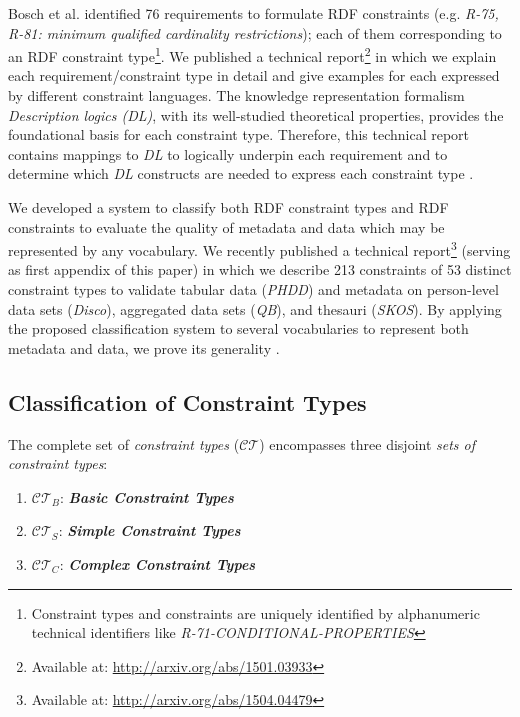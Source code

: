 \documentclass{llncs}
\begin{document}
Bosch et al. identified 76 requirements to formulate RDF constraints (e.g. \emph{R-75, R-81: minimum qualified cardinality restrictions}); each of them corresponding to an RDF constraint type\footnote{Constraint types and constraints are uniquely identified by alphanumeric technical identifiers like \emph{R-71-CONDITIONAL-PROPERTIES}}\cite{BoschNolleAcarEckert2015}. 
We published a technical report\footnote{Available at: \url{http://arxiv.org/abs/1501.03933}} in which we explain each requirement/constraint type in detail and give examples for each expressed by different constraint languages.
The knowledge representation formalism \emph{Description logics (DL)}, with its  well-studied theoretical properties, provides the foundational basis for each constraint type.
Therefore, this technical report contains mappings to \emph{DL} to logically underpin each requirement and to determine which \emph{DL} constructs are needed to express each constraint type \cite{BoschNolleAcarEckert2015}.

We developed a system to classify both RDF constraint types and RDF constraints to evaluate the quality of metadata and data which may be represented by any vocabulary.
We recently published a technical report\footnote{\label{technical-report-1}Available at: \url{http://arxiv.org/abs/1504.04479}} (serving as first appendix of this paper) in which we describe 213 constraints of 53 distinct constraint types 
to validate tabular data (\emph{PHDD}) and metadata on person-level data sets (\emph{Disco}), aggregated data sets (\emph{QB}), and thesauri (\emph{SKOS}).
By applying the proposed classification system to several vocabularies to represent both metadata and data, we prove its generality \cite{BoschZapilkoWackerowEckert2015}.

\subsection{Classification of Constraint Types}

The complete set of \emph{constraint types} ($\mathcal{CT}$) encompasses three disjoint \emph{sets of constraint types}:
\begin{enumerate}
	\item $\mathcal{CT}_{B}$: \textbf{\emph{Basic Constraint Types}}
	\item $\mathcal{CT}_{S}$: \textbf{\emph{Simple Constraint Types}}
	\item $\mathcal{CT}_{C}$: \textbf{\emph{Complex Constraint Types}}
\end{enumerate}
\end{document}

